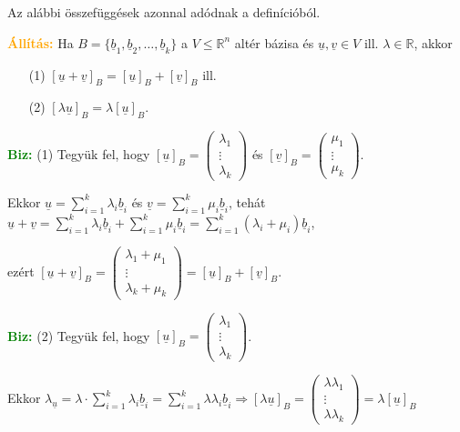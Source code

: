\documentclass[../szamtud.tex]{subfiles}
\begin{document}
        Az alábbi összefüggések azonnal adódnak a definícióból. 

        \textcolor{orange}{\textbf{Állítás:}} Ha $B = \{\underline{b}_1, \underline{b}_2, \dots, \underline{b}_k\}$ a $V \leq \mathbb{R}^n$ altér bázisa és $\underline{u}, \underline{v} \in V$ ill. $\lambda \in \mathbb{R}$, akkor  
        \begin{itemize}
            \item[(1)] $[\underline{u} + \underline{v}]_B = [\underline{u}]_B + [\underline{v}]_B$ ill.
            \item[(2)] $[\lambda\underline{u}]_B = \lambda[\underline{u}]_B$.
        \end{itemize}

        \textcolor{green}{\textbf{Biz:}} (1) Tegyük fel, hogy $[\underline{u}]_B = \begin{pmatrix} \lambda_1 \\ \vdots \\ \lambda_k\end{pmatrix}$ és $[\underline{v}]_B = \begin{pmatrix} \mu_1 \\ \vdots \\ \mu_k\end{pmatrix}$. 
        
        Ekkor $\underline{u} = \sum_{i=1}^{k}\lambda_i \underline{b}_i$ és $\underline{v} = \sum_{i=1}^{k}\mu_i \underline{b}_i$, tehát $\underline{u} + \underline{v} = \sum_{i=1}^{k}\lambda_i \underline{b}_i + \sum_{i=1}^{k}\mu_i \underline{b}_i = \sum_{i=1}^{k}(\lambda_i + \mu_i) \underline{b}_i$, 
        
        ezért $[\underline{u} + \underline{v}]_B = \begin{pmatrix} \lambda_1 + \mu_1 \\ \vdots \\ \lambda_k + \mu_k \end{pmatrix} = [\underline{u}]_B + [\underline{v}]_B$.

        \textcolor{green}{\textbf{Biz:}} (2) Tegyük fel, hogy $[\underline{u}]_B = \begin{pmatrix} \lambda_1 \\ \vdots \\ \lambda_k \end{pmatrix}$. 
        
        Ekkor $\lambda_{\underline{u}} = \lambda \cdot \sum_{i=1}^{k}\lambda_i \underline{b}_i = \sum_{i=1}^{k}\lambda\lambda_i \underline{b}_i \Rightarrow [\lambda \underline{u}]_B = \begin{pmatrix} \lambda\lambda_1 \\ \vdots \\ \lambda\lambda_k \end{pmatrix} = \lambda[\underline{u}]_B$
\end{document}
